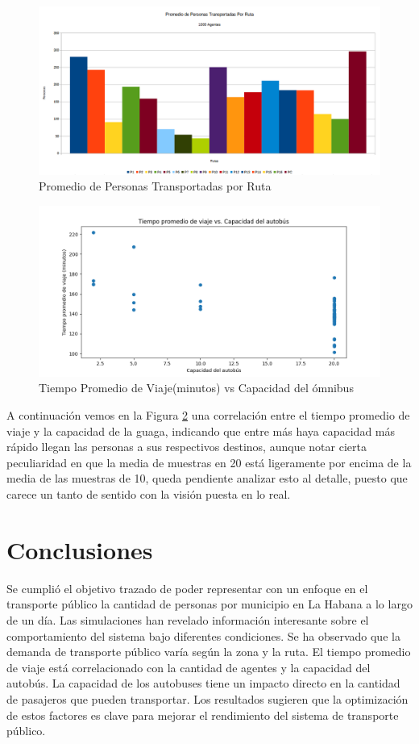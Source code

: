 \documentclass[a4paper,12pt]{article}
\begin{document}
\begin{figure}[H]
     \hspace{-2cm}
    \includegraphics[width=1.3\textwidth]{imgs/pptr.png}
    \caption{Promedio de Personas Transportadas por Ruta}
    \label{fig:6}
\end{figure}
\begin{figure}[H]
    \centering
    \includegraphics[width=1\textwidth]{imgs/tiempo_capacidad.png}
    \caption{Tiempo Promedio de Viaje(minutos) vs Capacidad del \'omnibus}
    \label{fig:7}
\end{figure}
\newpage
A continuaci\'on vemos en la Figura \ref{fig:7} una correlaci\'on entre el tiempo promedio de viaje y la capacidad de la guaga, indicando que entre m\'as haya capacidad m\'as r\'apido llegan las personas a sus respectivos destinos, aunque notar cierta peculiaridad en que la media de muestras en 20 est\'a ligeramente por encima de la media de las muestras de 10, queda pendiente analizar esto al detalle, puesto que carece un tanto de sentido con la visi\'on puesta en lo real. 


\section{Conclusiones}
Se cumpli\'o el objetivo trazado de poder representar con un enfoque en el transporte p\'ublico la cantidad de personas por municipio en La Habana a lo largo de un d\'ia. Las simulaciones han revelado información interesante sobre el comportamiento del sistema bajo diferentes condiciones. Se ha observado que la demanda de transporte público varía según la zona y la ruta. El tiempo promedio de viaje está correlacionado con la cantidad de agentes y la capacidad del autobús. La capacidad de los autobuses tiene un impacto directo en la cantidad de pasajeros que pueden transportar. Los resultados sugieren que la optimización de estos factores es clave para mejorar el rendimiento del sistema de transporte público. 
\end{document}
